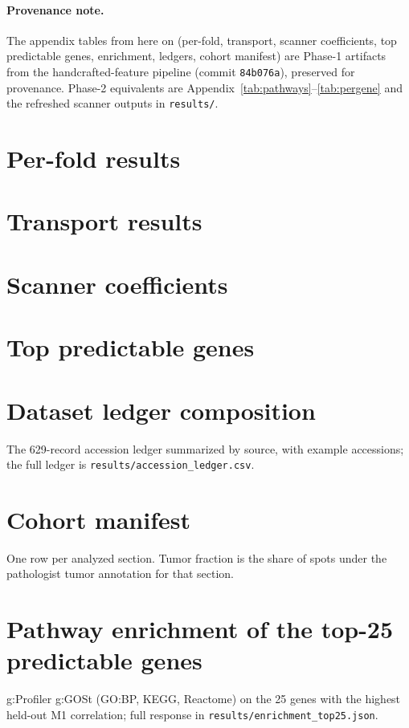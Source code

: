 \documentclass[11pt]{article}
\begin{document}
\paragraph{Provenance note.} The appendix tables from here on (per-fold, transport,
scanner coefficients, top predictable genes, enrichment, ledgers, cohort manifest) are
Phase-1 artifacts from the handcrafted-feature pipeline (commit \texttt{84b076a}), preserved
for provenance. Phase-2 equivalents are Appendix~\ref{tab:pathways}--\ref{tab:pergene} and
the refreshed scanner outputs in \texttt{results/}.

\section{Per-fold results}


\section{Transport results}


\section{Scanner coefficients}


\section{Top predictable genes}


\section{Dataset ledger composition}
The 629-record accession ledger summarized by source, with example accessions; the
full ledger is \texttt{results/accession\_ledger.csv}.


\section{Cohort manifest}
One row per analyzed section. Tumor fraction is the share of spots under the
pathologist tumor annotation for that section.


\section{Pathway enrichment of the top-25 predictable genes}
g:Profiler g:GOSt (GO:BP, KEGG, Reactome) on the 25 genes with the highest
held-out M1 correlation; full response in \texttt{results/enrichment\_top25.json}.

\end{document}

